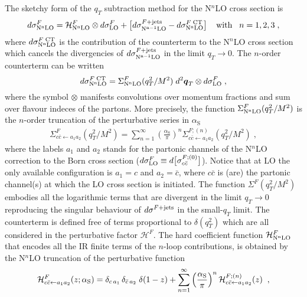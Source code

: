 \documentclass[12pt]{article}
\def\beeq{\begin{eqnarray}}
\def\eeeq{\end{eqnarray}}
\def\bom#1{{\mbox{\boldmath $#1$}}}
\newcommand\as{\alpha_{\mathrm{S}}}
\def\ito{\leftarrow}
\def\qt{q_T}
\begin{document}
The sketchy form of the $\qt$ subtraction method \cite{Catani:2007vq} for the N$^{n}$LO cross section is
 \begin{equation}
 \label{masterEqqT}
 d\sigma^{F}_{\rm N^{n}LO} = \mathcal{H}^{F}_{\rm N^{n}LO} \otimes d\sigma^{F}_{\rm LO} + \big[ d\sigma^{F+{\rm jets}}_{\rm N^{n-1}LO} -  d\sigma^{F\;{\rm CT}}_{\rm N^{n}LO} \big]\;\;\;\;{\rm with}\;\;\; n=1,2,3\;,
 \end{equation}
where $d\sigma^{F\;{\rm CT}}_{\rm N^{n}LO}$ is the contribution of the counterterm to the N$^{n}$LO cross section which cancels the divergencies of $d\sigma^{F+{\rm jets}}_{\rm N^{n-1}LO}$ in the limit $\qt \rightarrow 0$. The $n$-order counterterm can be written
\begin{equation}
  d\sigma^{F\;{\rm CT}}_{\rm N^{n}LO} =   \Sigma^{F}_{\rm N^{n}LO}(\qt^{2}/M^{2})\;d^{2}\bom{q}_{T}   \otimes d\sigma^{F}_{\rm LO}\;,
\end{equation}
where the symbol $ \otimes$ manifests convolutions over momentum fractions and sum over flavour indeces of the partons.
More precisely, the function $\Sigma^{F}_{\rm N^{n}LO}(\qt^{2}/M^{2})$ is the $n$-order truncation of the perturbative series in $\as$
\beeq
\Sigma^{F}_{c\bar{c}\leftarrow a_{1}a_{2}}(\qt^{2}/M^{2}) =  \sum_{n=1}^\infty \left( \frac{\as}{\pi} \right)^n \Sigma^{F;(n)}_{c\bar{c}\leftarrow a_{1}a_{2}}(\qt^{2}/M^{2})\;,
\eeeq
where the labels $a_{1}$ and $a_{2}$ stands for the partonic channels of the N$^{n}$LO correction to the Born cross section ($d\sigma^{F}_{\rm LO}\equiv d\big[\sigma^{F;(0)}_{c\bar{c}}\big]$). Notice that at LO the only available configuration is $a_{1}=c$ and $a_{2}=\bar{c}$, where $c\bar{c}$ is (are) the partonic channel(s) at which the LO cross section is initiated.
The function $ \Sigma^{F}(\qt^{2}/M^{2})$ embodies all the logarithmic terms that are divergent in the limit $\qt \rightarrow 0$ reproducing the singular behaviour of  $d\sigma^{F+{\rm jets}}$ in the small-$\qt$ limit. The counterterm is defined free of terms proportional to $\delta(\qt^{2})$ which are all considered in the perturbative factor $\mathcal{H}^{F}$. The hard coefficient function $\mathcal{H}^{F}_{\rm N^{n}LO}$  that encodes all the IR finite terms of the $n$-loop contributions, is obtained by the N$^{n}$LO truncation of the perturbative function
\begin{equation}
\label{Hstexpand}
{\cal H}^F_{c\bar{c}\ito a_{1}a_{2}}(z;\as) =\delta_{c\,a_{1}} \,\delta_{\bar{c}\,a_{2}}\;\delta(1-z)+
\sum_{n=1}^{\infty}\left(\frac{\as}{\pi}\right)^n 
{\cal H}^{F;(n)}_{c\bar{c}\ito a_{1}a_{2}}(z) \;\; ,
\end{equation}
\end{document}
